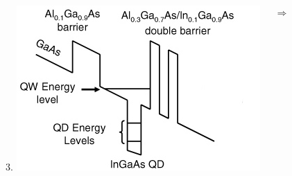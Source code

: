 \documentclass[10pt,pdf,hyperref={unicode},aspectratio={169}]{beamer}
\begin{document}
\begin{frame}
\begin{columns}
	{\large\color{red}3.}
	\includegraphics[width=.7\textwidth,center]{assets/QDMemory}
	
		\Huge{$\Rightarrow$}	
		\begin{center}

\end{center}
\end{columns}
\end{frame}
\end{document}
